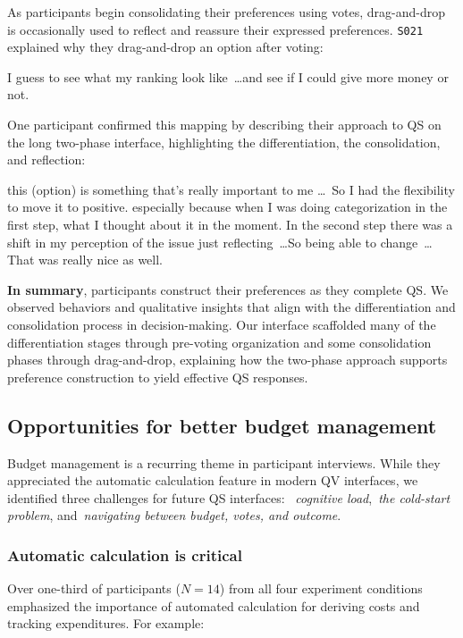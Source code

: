 As participants begin consolidating their preferences using votes, drag-and-drop is occasionally used to reflect and reassure their expressed preferences. \texttt{S021} explained why they drag-and-drop an option after voting:

\begin{displayquote}
    I guess to see what my ranking look like~\ldots and see if I could give more money or not. \hfill{}
\end{displayquote}

One participant confirmed this mapping by describing their approach to QS on the long two-phase interface, highlighting the differentiation, the consolidation, and reflection:

\begin{displayquote}
\bracketellipsis this (option) is something that's really important to me \ldots\ So I had the flexibility to move it to positive. \bracketellipsis especially because when I was doing categorization in the first step, \bracketellipsis what I thought about it in the moment. \bracketellipsis In the second step there was a shift in my perception of the issue just reflecting~\ldots So being able to change~\ldots That was really nice as well. \hfill{}
\end{displayquote}

\textbf{In summary}, participants construct their preferences as they complete QS. We observed behaviors and qualitative insights that align with the differentiation and consolidation process in decision-making. Our interface scaffolded many of the differentiation stages through pre-voting organization and some consolidation phases through drag-and-drop, explaining how the two-phase approach supports preference construction to yield effective QS responses.

\subsection{Opportunities for better budget management}
Budget management is a recurring theme in participant interviews. While they appreciated the automatic calculation feature in modern QV interfaces, we identified three challenges for future QS interfaces: ~\textit{cognitive load},~\textit{the cold-start problem}, and~\textit{navigating between budget, votes, and outcome}.

\subsubsection{Automatic calculation is critical}
Over one-third of participants ($N=14$) from all four experiment conditions emphasized the importance of automated calculation for deriving costs and tracking expenditures. For example:

